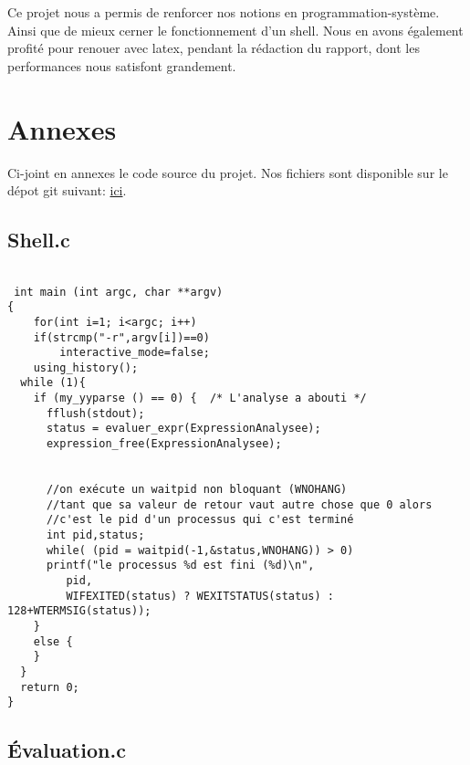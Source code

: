 \documentclass[12pt]{article}
\begin{document}
Ce projet nous a permis de renforcer nos notions en programmation-système. Ainsi que de mieux cerner le fonctionnement d'un shell. Nous en avons également profité pour renouer avec latex, pendant la rédaction du rapport, dont les performances nous satisfont grandement.


\newpage
\section{Annexes}

Ci-joint en annexes le code source du projet. Nos fichiers sont disponible sur le dépot git suivant:
 \href{https://github.com/beziarum/shell.git}{ici}.

 \scriptsize
\subsection{Shell.c}
\label{main}
\begin{verbatim}

 int main (int argc, char **argv)
{
    for(int i=1; i<argc; i++)
	if(strcmp("-r",argv[i])==0)
	    interactive_mode=false;
    using_history();
  while (1){
    if (my_yyparse () == 0) {  /* L'analyse a abouti */
      fflush(stdout);
      status = evaluer_expr(ExpressionAnalysee);
      expression_free(ExpressionAnalysee);


      //on exécute un waitpid non bloquant (WNOHANG)
      //tant que sa valeur de retour vaut autre chose que 0 alors
      //c'est le pid d'un processus qui c'est terminé
      int pid,status;
      while( (pid = waitpid(-1,&status,WNOHANG)) > 0)
	  printf("le processus %d est fini (%d)\n",
		 pid,
		 WIFEXITED(status) ? WEXITSTATUS(status) : 128+WTERMSIG(status));
    }
    else {
    }
  }
  return 0;
}
\end{verbatim}


\subsection{Évaluation.c}
\end{document}
